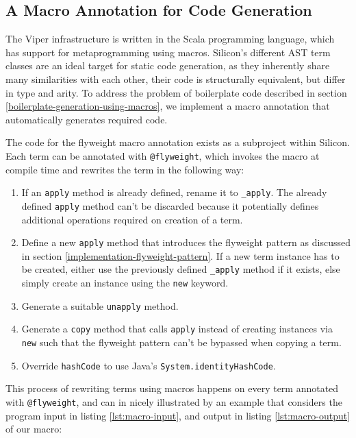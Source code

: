 \documentclass[11pt]{article}
\begin{document}
    \subsection{A Macro Annotation for Code Generation}

    The Viper infrastructure is written in the Scala programming language, which 
    has support for metaprogramming using macros. Silicon's different AST term classes are 
    an ideal target for static code generation, as they inherently share
    many similarities with each other, their code is structurally equivalent,
    but differ in type and arity.
    To address the problem of boilerplate
    code described in section \ref{boilerplate-generation-using-macros}, we implement
    a macro annotation that automatically generates required code.

    The code for the flyweight macro annotation exists as a subproject within Silicon. Each term can be
    annotated with \texttt{@flyweight}, which invokes the macro at compile time and 
    rewrites the term in the following way:

    \begin{enumerate}
        \item If an \texttt{apply} method is already defined, rename it to \texttt{\_apply}.
            The already defined \texttt{apply} method can't be discarded because it potentially
            defines additional operations required on creation of a term.
        \item Define a new \texttt{apply} method that introduces the flyweight pattern
            as discussed in section \ref{implementation-flyweight-pattern}.
            If a new term instance has to be created, either use  the previously 
            defined \texttt{\_apply} method
            if it exists, else simply create an instance using the \texttt{new} keyword.
        \item Generate a suitable \texttt{unapply} method.
        \item Generate a \texttt{copy} method that calls \texttt{apply} instead of creating
            instances via \texttt{new} such that the flyweight pattern can't be bypassed
            when copying a term.
        \item Override \texttt{hashCode} to use Java's \texttt{System.identityHashCode}.
    \end{enumerate}

    This process of rewriting terms using macros happens on every term
    annotated with \texttt{@flyweight}, and can in nicely illustrated by an example
    that considers the program input in listing \ref{lst:macro-input}, and output in listing \ref{lst:macro-output} of our macro:
\end{document}
